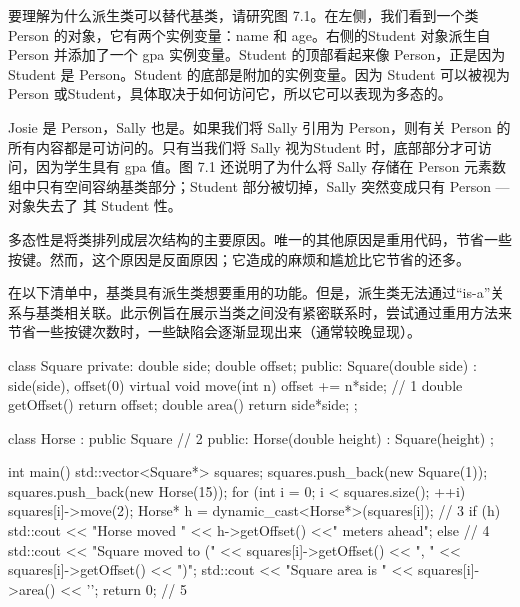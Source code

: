 要理解为什么派生类可以替代基类，请研究图 7.1。在左侧，我们看到一个类 Person 的对象，它有两个实例变量：name 和 age。右侧的Student 对象派生自 Person 并添加了一个 gpa 实例变量。Student 的顶部看起来像 Person，正是因为 Student 是 Person。Student 的底部是附加的实例变量。因为 Student 可以被视为 Person 或Student，具体取决于如何访问它，所以它可以表现为多态的。

Josie 是 Person，Sally 也是。如果我们将 Sally 引用为 Person，则有关 Person 的所有内容都是可访问的。只有当我们将 Sally 视为Student 时，底部部分才可访问，因为学生具有 gpa 值。图 7.1 还说明了为什么将 Sally 存储在 Person 元素数组中只有空间容纳基类部分；Student 部分被切掉，Sally 突然变成只有 Person — 对象失去了 其 Student 性。



多态性是将类排列成层次结构的主要原因。唯一的其他原因是重用代码，节省一些按键。然而，这个原因是反面原因；它造成的麻烦和尴尬比它节省的还多。

在以下清单中，基类具有派生类想要重用的功能。但是，派生类无法通过“is-a”关系与基类相关联。此示例旨在展示当类之间没有紧密联系时，尝试通过重用方法来节省一些按键次数时，一些缺陷会逐渐显现出来（通常较晚显现）。


\begin{cpp}
class Square {
private:
  double side;
  double offset;
public:
  Square(double side) : side(side), offset(0) {}
  virtual void move(int n) { offset += n*side; } // 1
  double getOffset() { return offset; }
  double area() { return side*side; }
};

class Horse : public Square { // 2
public:
  Horse(double height) : Square(height) {}
};

int main() {
  std::vector<Square*> squares;
  squares.push_back(new Square(1));
  squares.push_back(new Horse(15));
  for (int i = 0; i < squares.size(); ++i) {
    squares[i]->move(2);
    Horse* h = dynamic_cast<Horse*>(squares[i]); // 3
    if (h) {
      std::cout << "Horse moved " << h->getOffset()
        <<" meters ahead\n";
    } else { // 4
      std::cout << "Square moved to (" << squares[i]->getOffset()
        << ", " << squares[i]->getOffset() << ")\n";
      std::cout << "Square area is " << squares[i]->area() << '\n';
    }
  }
  return 0; // 5
}
\end{cpp}

